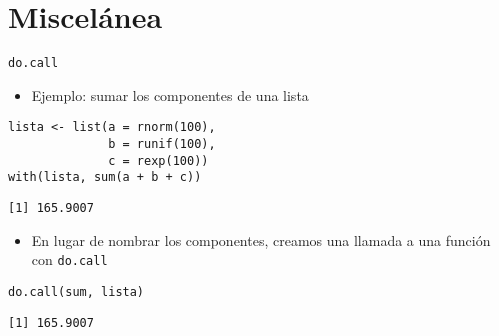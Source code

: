 \documentclass[xcolor={usenames,svgnames,dvipsnames}]{beamer}
\begin{document}
\section{Miscelánea}
\label{sec:orgheadline33}
\begin{frame}[fragile,label={sec:orgheadline28}]{\texttt{do.call}}
 \begin{itemize}
\item Ejemplo: sumar los componentes de una lista
\end{itemize}
\lstset{language=R,label= ,caption= ,captionpos=b,numbers=none}
\begin{lstlisting}
lista <- list(a = rnorm(100),
              b = runif(100),
              c = rexp(100))
with(lista, sum(a + b + c))
\end{lstlisting}

\begin{verbatim}
[1] 165.9007
\end{verbatim}

\begin{itemize}
\item En lugar de nombrar los componentes, creamos una llamada a una
función con \texttt{do.call}
\end{itemize}
\lstset{language=R,label= ,caption= ,captionpos=b,numbers=none}
\begin{lstlisting}
do.call(sum, lista)
\end{lstlisting}

\begin{verbatim}
[1] 165.9007
\end{verbatim}
\end{frame}
\end{document}
